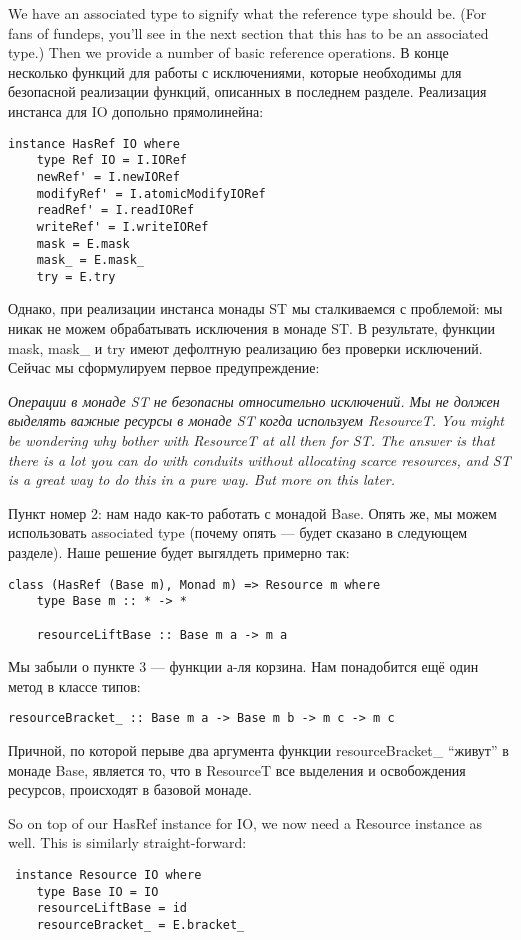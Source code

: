 We have an associated type to signify what the reference type should be. (For fans of
fundeps,
you'll see in the next section that this has to be an associated type.) Then we provide a
number of basic reference operations. В конце несколько функций для работы с
исключениями, которые необходимы для безопасной реализации функций, описанных в
последнем разделе. Реализация инстанса для IO допольно прямолинейна:
  
\begin{lstlisting}
instance HasRef IO where
    type Ref IO = I.IORef
    newRef' = I.newIORef
    modifyRef' = I.atomicModifyIORef
    readRef' = I.readIORef
    writeRef' = I.writeIORef
    mask = E.mask
    mask_ = E.mask_
    try = E.try 
\end{lstlisting}
Однако, при реализации инстанса монады ST мы сталкиваемся с проблемой: мы никак не можем
обрабатывать исключения в монаде ST. В результате, функции mask, mask\_ и try имеют
дефолтную реализацию без проверки исключений. Сейчас мы сформулируем первое
предупреждение:

\textit{Операции в монаде ST не безопасны относительно исключений. Мы не должен выделять
важные ресурсы в монаде ST когда используем ResourceT. You might be wondering why bother
with
ResourceT at all then for ST. The answer is that there is a
lot you can do with conduits without allocating scarce resources, and ST is a
great way to do this in a pure way. But more on this later. }

Пункт номер 2: нам надо как-то работать с монадой Base. Опять же, мы можем
использовать 
associated type (почему опять --- будет сказано в следующем разделе). Наше решение будет
выгялдеть примерно так:
\begin{lstlisting}
class (HasRef (Base m), Monad m) => Resource m where
    type Base m :: * -> *

    resourceLiftBase :: Base m a -> m a 
\end{lstlisting}
Мы забыли о пункте 3 --- функции а-ля корзина. Нам понадобится ещё один метод в классе
типов:
\begin{lstlisting}
resourceBracket_ :: Base m a -> Base m b -> m c -> m c 
\end{lstlisting}
Причной, по которой перыве два аргумента функции resourceBracket\_ ``живут'' в монаде
Base,
является то, что в ResourceT все выделения и освобождения ресурсов, происходят в базовой
 монаде.

So on top of our HasRef instance for IO, we now need a
Resource instance as well. This is similarly straight-forward:
\begin{lstlisting}
 instance Resource IO where
    type Base IO = IO
    resourceLiftBase = id
    resourceBracket_ = E.bracket_
\end{lstlisting}

